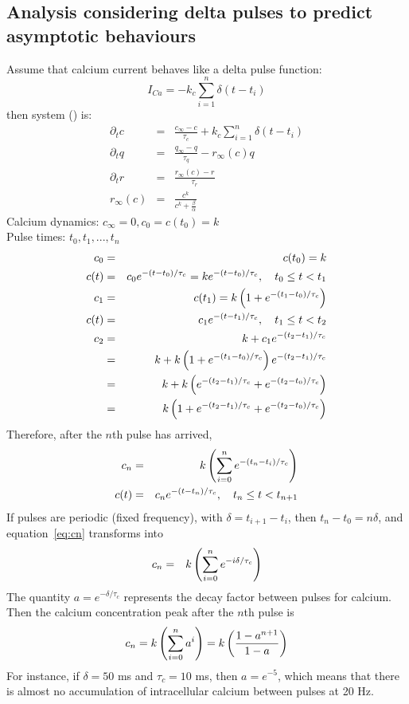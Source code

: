 \subsection{Analysis considering delta pulses to predict asymptotic behaviours}
Assume that calcium current behaves like a delta pulse function: 
\begin{equation}
    I_{Ca}= - k_c \sum_{i=1}^n \delta(t-t_i) 
\end{equation}
then system () is: 
\begin{eqnarray} 
\label{eq : deltap}
\partial_t c &=& \frac{c_{\infty}-c}{\tau_c} + k_c \sum_{i=1}^n \delta(t-t_i) \\
\partial_t q &=&  \frac{q_{\infty}-q}{\tau_q} - r_{\infty}(c) q \\
\partial_t r &=& \frac{r_{\infty}(c) - r}{\tau_r}  
\\
r_{\infty}(c) &=& \frac{c^k}{c^k + \frac{\beta}{\alpha}} 
\label{eq : deltapp}
\end{eqnarray}
Calcium dynamics: $c_{\infty} = 0 , c_0 = c(t_0) = k $
\\
Pulse times: $t_0, t_1, ..., t_n$
\begin{eqnarray*}
c_0 &=& c(t_0) = k
\\
c(t) &=& c_0 e^{-(t-t_0)/\tau_c}
=k e^{-(t-t_0)/\tau_c}, \quad t_0\leq t <t_1
\\
c_1 &=& c(t_1) = k \left(1 + e^{-(t_1-t_0)/\tau_c}\right)
\\
c(t) &=& c_1 e^{-(t-t_1)/\tau_c}, \quad t_1\leq t <t_2
\\
c_2 &=& k+ c_1 e^{-(t_2-t_1)/\tau_c}  
\\
&=& k+ k \left(1 + e^{-(t_1-t_0)/\tau_c}\right) e^{-(t_2-t_1)/\tau_c} 
\\
&=& k+ k  \left(e^{-(t_2-t_1)/\tau_c}  + e^{-(t_2-t_0)/\tau_c}\right) 
\\
&=& k \left(1+e^{-(t_2-t_1)/\tau_c}  + e^{-(t_2-t_0)/\tau_c}\right)
\end{eqnarray*}
Therefore, after the $n$th pulse has arrived,
\begin{eqnarray}
c_n &=& k \left( 
\sum_{i=0}^{n} e^{-(t_n-t_{i})/\tau_c} 
\right)
\label{eq:cn}
\\
c(t) &=& c_n e^{-(t-t_n)/\tau_c}, \quad t_n\leq t <t_{n+1}
\label{eq:c(t)tn}
\end{eqnarray}
If pulses are periodic (fixed frequency), with $\delta = t_{i+1}-t_i$, then $t_n - t_0 = n \delta$, and equation~\eqref{eq:cn} transforms into
\begin{eqnarray}
c_n &=& k \left( 
\sum_{i=0}^{n} e^{-i\delta/\tau_c} 
\right)
\label{eq:cnPeriodicPulses}
\end{eqnarray}
The quantity $a = e^{-\delta/\tau_c}$ represents the decay factor between pulses for calcium. Then the calcium concentration peak after the $n$th pulse is 
\begin{equation}
c_n=k \left( 
\sum_{i=0}^{n} a^{i} 
\right)
= k \left(\frac{1-a^{n+1}}{1-a}\right)
\label{eq:cAsymptotic}
\end{equation}
For instance, if $\delta=50$ ms and $\tau_c = 10$ ms, then $a=e^{-5}$, which means that there is almost no accumulation of intracellular calcium between pulses at 20 Hz. 

